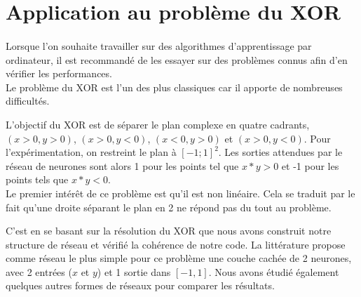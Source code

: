 


\section{Application au problème du XOR}

\paragraph*{}
Lorsque l'on souhaite travailler sur des algorithmes d'apprentissage par ordinateur, il est recommandé de les essayer sur des problèmes connus afin d'en vérifier les performances. \\
Le problème du XOR est l'un des plus classiques car il apporte de nombreuses difficultés.

L'objectif du XOR est de séparer le plan complexe en quatre cadrants, $(x >0, y > 0)$, $ (x>0, y<0)$, $ (x<0, y>0)$ et $ (x>0, y<0) $. Pour l'expérimentation, on restreint le plan à $[-1;1]^2$. Les sorties attendues par le réseau de neurones sont alors 1 pour les points tel que $x*y > 0 $ et -1 pour les points tels que $x*y<0$. \\
Le premier intérêt de ce problème est qu'il est non linéaire. Cela se traduit par le fait qu'une droite séparant le plan en 2 ne répond pas du tout au problème.

C'est en se basant sur la résolution du XOR que nous avons construit notre structure de réseau et vérifié la cohérence de notre code. La littérature propose comme réseau le plus simple pour ce problème une couche cachée de 2 neurones, avec 2 entrées ($x$ et $y$) et 1 sortie dans $[-1, 1]$. Nous avons étudié également quelques autres formes de réseaux pour comparer les résultats.

